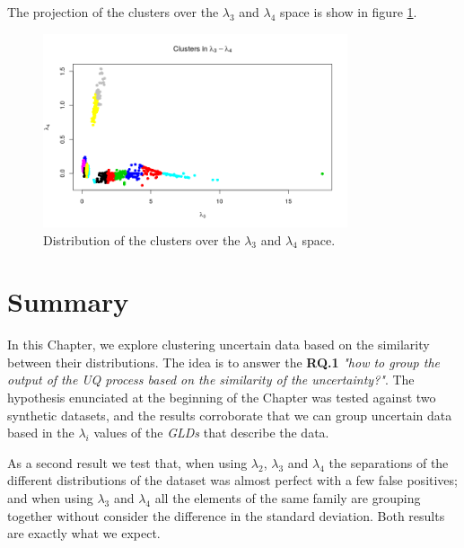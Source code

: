 The projection of the clusters over the $\lambda_{3}$ and $\lambda_{4}$ space is show in figure \ref{fig:dataset2_l3l4_l3_l4}.

\begin{figure}[H]
    \centering
    \includegraphics[width=0.8\textwidth]{img/gld_clustering/Dataset2/nuevo/l3_l4/l3_l4.png}
    \caption{Distribution of the clusters over the $\lambda_{3}$ and $\lambda_{4}$ space.}
    \label{fig:dataset2_l3l4_l3_l4}
\end{figure}

\section{Summary}\label{sec:clustering_summary}

In this Chapter, we explore clustering uncertain data based on the similarity between their distributions. The idea is to answer the \textbf{RQ.1} \textit{"how to group the output of the UQ process based on the similarity of the uncertainty?"}. The hypothesis enunciated at the beginning of the Chapter was tested against two synthetic datasets, and the results corroborate that we can group uncertain data based in the $\lambda_{i}$ values of the \textit{GLDs} that describe the data.

As a second result we test that, when using $\lambda_{2}$, $\lambda_{3}$ and $\lambda_{4}$ the separations of the different distributions of the dataset was almost perfect with a few false positives; and when using $\lambda_{3}$ and $\lambda_{4}$ all the elements of the same family are grouping together without consider the difference in the standard deviation. Both results are exactly what we expect.

